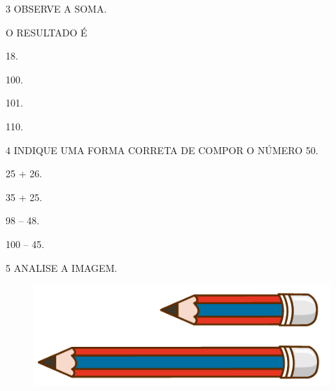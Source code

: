 \num{3} OBSERVE A SOMA.\bigskip

\hspace*{\fill}\hspace*{\fill}

\vspace{1cm}

O RESULTADO É

\begin{escolha}[itemsep=0pt]
\item 18.

\item 100.

\item 101.

\item 110.
\end{escolha}

\num{4} INDIQUE UMA FORMA CORRETA DE COMPOR O NÚMERO 50.

\begin{escolha}[itemsep=0pt]
\item 25 + 26.

\item 35 + 25.

\item 98 -- 48.

\item 100 -- 45.
\end{escolha}

\num{5} ANALISE A IMAGEM.


\begin{figure}[H]
\centering
\includegraphics[width=.5\textwidth]{./media/SAEB_1ANO_MAT_FIGURA113.png}
\end{figure}

